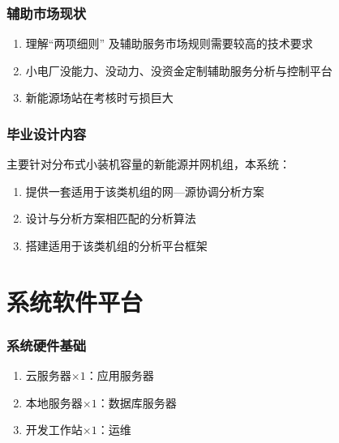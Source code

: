 \documentclass[aspectratio=43, 10pt, utf8, mathserif]{beamer}
\begin{document}
		\begin{frame}
		\frametitle{辅助市场现状}
		\begin{enumerate}
			\item 理解“两项细则” 及辅助服务市场规则需要较高的技术要求
			\item 小电厂没能力、没动力、没资金定制辅助服务分析与控制平台
			\item 新能源场站在考核时亏损巨大
		\end{enumerate}
	\end{frame}
	
	
	\begin{frame}
		\frametitle{毕业设计内容}
		\zihao{3}
		主要针对分布式小装机容量的新能源并网机组，本系统：
		\begin{enumerate}
			\item 提供一套适用于该类机组的网—源协调分析方案
			\item 设计与分析方案相匹配的分析算法
			\item 搭建适用于该类机组的分析平台框架
		\end{enumerate}
	\end{frame}


	\section{系统软件平台}
	
	\begin{frame}
		\frametitle{系统硬件基础}
		\begin{enumerate}
			\item 云服务器$ \times 1$：应用服务器
			\item 本地服务器$ \times 1$：数据库服务器
			\item 开发工作站$ \times 1$：运维
		\end{enumerate}
		
	\end{frame}
\end{document}
